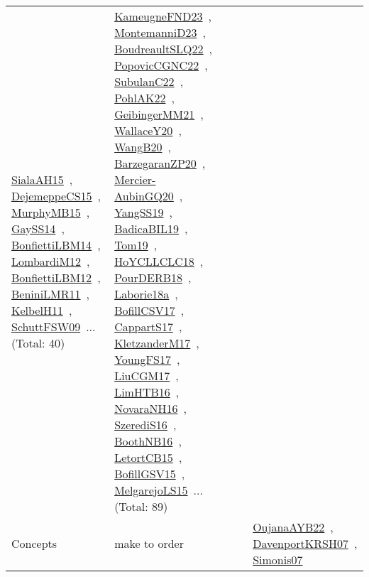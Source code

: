 {\begin{longtable}{lp{3cm}>{\raggedright\arraybackslash}p{6cm}>{\raggedright\arraybackslash}p{6cm}>{\raggedright\arraybackslash}p{8cm}}
\href{papers/SialaAH15.pdf}{SialaAH15}~\cite{SialaAH15}, \href{papers/DejemeppeCS15.pdf}{DejemeppeCS15}~\cite{DejemeppeCS15}, \href{papers/MurphyMB15.pdf}{MurphyMB15}~\cite{MurphyMB15}, \href{papers/GaySS14.pdf}{GaySS14}~\cite{GaySS14}, \href{articles/BonfiettiLBM14.pdf}{BonfiettiLBM14}~\cite{BonfiettiLBM14}, \href{articles/LombardiM12.pdf}{LombardiM12}~\cite{LombardiM12}, \href{papers/BonfiettiLBM12.pdf}{BonfiettiLBM12}~\cite{BonfiettiLBM12}, \href{articles/BeniniLMR11.pdf}{BeniniLMR11}~\cite{BeniniLMR11}, \href{articles/KelbelH11.pdf}{KelbelH11}~\cite{KelbelH11}, \href{papers/SchuttFSW09.pdf}{SchuttFSW09}~\cite{SchuttFSW09}... (Total: 40) & \href{papers/KameugneFND23.pdf}{KameugneFND23}~\cite{KameugneFND23}, \href{articles/MontemanniD23.pdf}{MontemanniD23}~\cite{MontemanniD23}, \href{papers/BoudreaultSLQ22.pdf}{BoudreaultSLQ22}~\cite{BoudreaultSLQ22}, \href{papers/PopovicCGNC22.pdf}{PopovicCGNC22}~\cite{PopovicCGNC22}, \href{articles/SubulanC22.pdf}{SubulanC22}~\cite{SubulanC22}, \href{articles/PohlAK22.pdf}{PohlAK22}~\cite{PohlAK22}, \href{papers/GeibingerMM21.pdf}{GeibingerMM21}~\cite{GeibingerMM21}, \href{articles/WallaceY20.pdf}{WallaceY20}~\cite{WallaceY20}, \href{papers/WangB20.pdf}{WangB20}~\cite{WangB20}, \href{papers/BarzegaranZP20.pdf}{BarzegaranZP20}~\cite{BarzegaranZP20}, \href{papers/Mercier-AubinGQ20.pdf}{Mercier-AubinGQ20}~\cite{Mercier-AubinGQ20}, \href{papers/YangSS19.pdf}{YangSS19}~\cite{YangSS19}, \href{papers/BadicaBIL19.pdf}{BadicaBIL19}~\cite{BadicaBIL19}, \href{papers/Tom19.pdf}{Tom19}~\cite{Tom19}, \href{papers/HoYCLLCLC18.pdf}{HoYCLLCLC18}~\cite{HoYCLLCLC18}, \href{articles/PourDERB18.pdf}{PourDERB18}~\cite{PourDERB18}, \href{papers/Laborie18a.pdf}{Laborie18a}~\cite{Laborie18a}, \href{papers/BofillCSV17.pdf}{BofillCSV17}~\cite{BofillCSV17}, \href{papers/CappartS17.pdf}{CappartS17}~\cite{CappartS17}, \href{papers/KletzanderM17.pdf}{KletzanderM17}~\cite{KletzanderM17}, \href{papers/YoungFS17.pdf}{YoungFS17}~\cite{YoungFS17}, \href{papers/LiuCGM17.pdf}{LiuCGM17}~\cite{LiuCGM17}, \href{papers/LimHTB16.pdf}{LimHTB16}~\cite{LimHTB16}, \href{articles/NovaraNH16.pdf}{NovaraNH16}~\cite{NovaraNH16}, \href{papers/SzerediS16.pdf}{SzerediS16}~\cite{SzerediS16}, \href{papers/BoothNB16.pdf}{BoothNB16}~\cite{BoothNB16}, \href{articles/LetortCB15.pdf}{LetortCB15}~\cite{LetortCB15}, \href{papers/BofillGSV15.pdf}{BofillGSV15}~\cite{BofillGSV15}, \href{papers/MelgarejoLS15.pdf}{MelgarejoLS15}~\cite{MelgarejoLS15}... (Total: 89)\\
Concepts & make to order &  &  & \href{papers/OujanaAYB22.pdf}{OujanaAYB22}~\cite{OujanaAYB22}, \href{papers/DavenportKRSH07.pdf}{DavenportKRSH07}~\cite{DavenportKRSH07}, \href{articles/Simonis07.pdf}{Simonis07}~\cite{Simonis07}\\

\end{longtable}}
